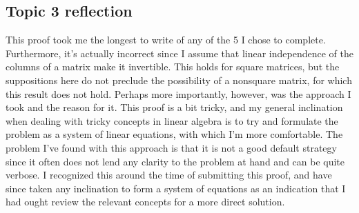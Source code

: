 \documentclass[11pt, letterpaper]{article}
\begin{document}
\begin{center}    
\end{center}
\subsection*{Topic 3 reflection}
This proof took me the longest to write of any of the 5 I chose to complete. Furthermore, it's actually incorrect
since I assume that linear independence of the columns of a matrix make it invertible. This holds for square 
matrices, but the suppositions here do not preclude the possibility of a nonsquare matrix, for which this result
does not hold. Perhaps more importantly, however, was the approach I took and the reason for it. This proof 
is a bit tricky, and my general inclination when dealing with tricky concepts in linear algebra is to try and
formulate the problem as a system of linear equations, with which I'm more comfortable. The problem I've 
found with this approach is that it is not a good default strategy since it often does not lend any clarity 
to the problem at hand and can be quite verbose. I recognized this around the time of submitting this proof, and have
since taken any inclination to form a system of equations as an indication that I had ought review the relevant
concepts for a more direct solution.  
\newpage
\end{document}
